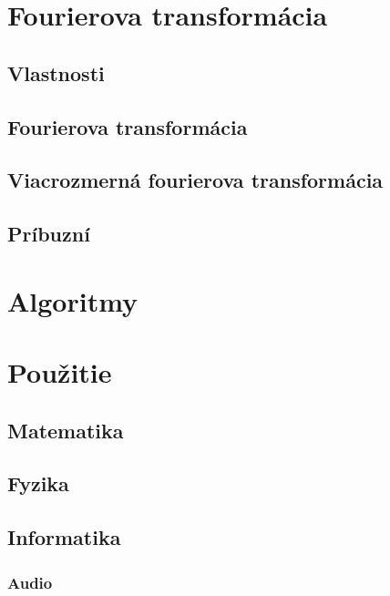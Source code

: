 



\chapter{Fourierova transformácia}
    
    
    
\section{Vlastnosti}
\section{Fourierova transformácia}
\section{Viacrozmerná fourierova transformácia}
\section{Príbuzní}

\chapter{Algoritmy}
    
    
    
    
    
    
    
    
    
    

\chapter{Použitie}
\section{Matematika}
    
    
    
    
    
         
\section{Fyzika}
    
    
    
    
    
\section{Informatika}
    
    
    
    
    
    \subsection{Audio}
    
    
